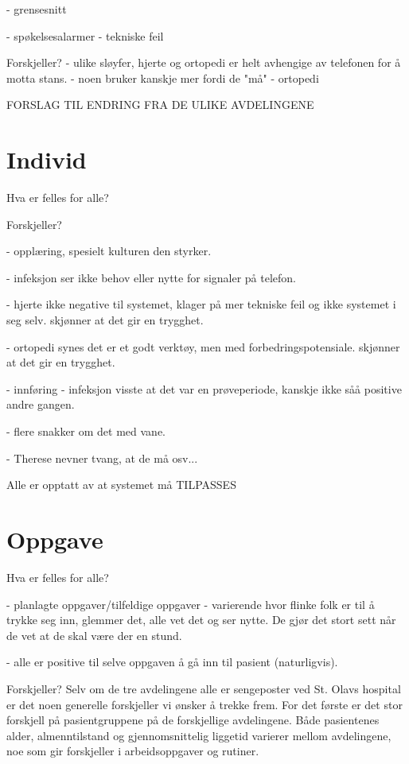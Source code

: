 - grensesnitt



- spøkelsesalarmer - tekniske feil



Forskjeller?
- ulike sløyfer, hjerte og ortopedi er helt avhengige av telefonen for å motta stans.	
	- noen bruker kanskje mer fordi de "må" - ortopedi
	
	
FORSLAG TIL ENDRING FRA DE ULIKE AVDELINGENE	

\section{Individ}
Hva er felles for alle?

Forskjeller?

- opplæring, spesielt kulturen den styrker.

- infeksjon ser ikke behov eller nytte for signaler på telefon.

- hjerte ikke negative til systemet, klager på mer tekniske feil og ikke systemet i seg selv. skjønner at det gir en trygghet.

- ortopedi synes det er et godt verktøy, men med forbedringspotensiale. skjønner at det gir en trygghet.

- innføring - infeksjon visste at det var en prøveperiode, kanskje ikke såå positive andre gangen.

- flere snakker om det med vane.

- Therese nevner tvang, at de må osv...

Alle er opptatt av at systemet må TILPASSES

\section{Oppgave}

Hva er felles for alle?

- planlagte oppgaver/tilfeldige oppgaver
- varierende hvor flinke folk er til å trykke seg inn, glemmer det, alle vet det og ser nytte. De gjør det stort sett når de vet at de skal være der en stund.

- alle er positive til selve oppgaven å gå inn til pasient (naturligvis). 


Forskjeller?
Selv om de tre avdelingene alle er sengeposter ved St. Olavs hospital er det noen generelle forskjeller vi ønsker å trekke frem. 
For det første er det stor forskjell på pasientgruppene på de forskjellige avdelingene. Både pasientenes alder, almenntilstand og gjennomsnittelig liggetid varierer mellom avdelingene, noe som gir forskjeller i arbeidsoppgaver og rutiner.  



